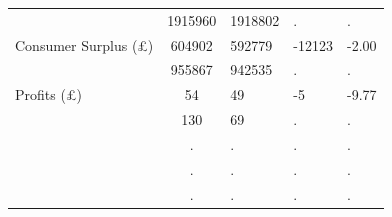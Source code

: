 \begin{tabular}{l*{1}{c}}
\quad       &     1915960&     1918802&           .&           .\\
\quad Consumer Surplus (\pounds)&      604902&      592779&      -12123&       -2.00\\
\quad       &      955867&      942535&           .&           .\\
\quad Profits (\pounds)&          54&          49&          -5&       -9.77\\
\quad       &         130&          69&           .&           .\\
\quad       &           .&           .&           .&           .\\
\quad       &           .&           .&           .&           .\\
\quad       &           .&           .&           .&           .\\
\hline\hline
\end{tabular}
